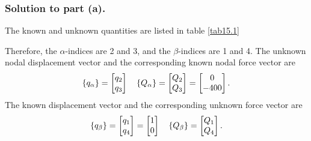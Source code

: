 \documentclass{AeroStructure-ERJohnson}
\begin{document}
\begin{example*}
\subsubsection{Solution to part (a).} The known and unknown quantities are listed in table \ref{tab15.1}
\setcounter{equation}{3}
\begin{table}[h]
\end{table}

\noindent Therefore, the $\alpha$-indices are 2 and 3, and the $\beta$-indices are 1 and 4. The unknown nodal displacement vector and the corresponding known nodal force vector are
\begin{align}\label{ex15.2d}
\{q_{\alpha}\}=\left[\begin{array}{@{}l@{}}q_{2} \\q_{3}\end{array}\right] \quad\{Q_{\alpha}\}=\left[\begin{array}{@{}l@{}}Q_{2} \\Q_{3}\end{array}\right]=\left[\begin{array}{@{}c@{}}0 \\-400\end{array}\right].
\end{align}
The known displacement vector and the corresponding unknown force vector are
\begin{align}\label{ex15.2e}
\{q_{\beta}\}=\left[\begin{array}{@{}l@{}}q_{1} \\q_{4}\end{array}\right]=\left[\begin{array}{@{}l@{}}1 \\0\end{array}\right] \quad\{Q_{\beta}\}=\left[\begin{array}{@{}l@{}}Q_{1} \\Q_{4}\end{array}\right].
\end{align}


\end{example*}
\end{document}

